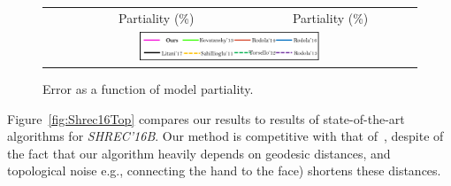 \documentclass[10pt,twocolumn,letterpaper]{article}
\begin{document}
\begin{figure}[htb]
\begin{tabular}{ccc}
	& Partiality (\%) & Partiality (\%)\\
	\multicolumn{3}{c}{\includegraphics[width=0.5\textwidth]{figures/SHREC16Amethods.png}}
\end{tabular}
	\caption{Error as a function of model partiality.}
		\label{fig:Shrec16Part}
\end{figure}

Figure~\ref{fig:Shrec16Top} compares our results to results of state-of-the-art algorithms\cite{vestner2017efficient,litany2017fully,rodola2017partial,chen2015robust,sahilliouglu2012scale,Rodola:2014:DNS:2679600.2679987,cosmo2016shrec} for {\em SHREC'16B}.
Our method is competitive with that of~\cite{vestner2017efficient}, despite of the fact that our algorithm heavily depends on geodesic distances, and topological noise e.g., connecting the hand to the face) shortens these distances.
\end{document}
